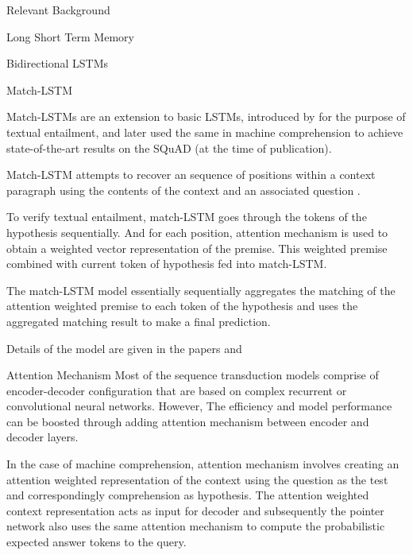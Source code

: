 \documentclass{article}
\begin{document}
\begin{psection}{Relevant Background}
\begin{psubsection}{Long Short Term Memory}
\begin{pssubsection}{Bidirectional LSTMs}

		\end{pssubsection}

		\begin{pssubsection}{Match-LSTM}

			Match-LSTMs \citep{match-lstm} are an extension to basic LSTMs, introduced by  for the purpose of textual entailment, and later used the same in machine comprehension to achieve state-of-the-art results on the SQuAD (at the time of publication).

			Match-LSTM attempts to recover an sequence of positions within a context paragraph using the contents of the context and an associated question \citep{match-lstm-m}.

			To verify textual entailment, match-LSTM goes through the tokens of the hypothesis sequentially. And for each position, attention mechanism is used to obtain a weighted vector representation of the premise. This weighted premise combined with current token of hypothesis fed into match-LSTM.

			\sloppy
			The match-LSTM model essentially sequentially aggregates the matching of the attention weighted premise to each token of the hypothesis and uses the aggregated matching result to make a final prediction.

			Details of the model are given in the papers \cite{match-lstm} and \cite{match-lstm-mc}

		\end{pssubsection}

		\begin{psubsection}{Attention Mechanism}
		Most of the sequence transduction models comprise of encoder-decoder configuration that are based on complex recurrent or convolutional neural networks. However, The efficiency and model performance can be boosted through adding attention mechanism between encoder and decoder layers.


		In the case of machine comprehension, attention mechanism involves creating an attention weighted representation of the context using the question as the test and correspondingly comprehension as hypothesis. The attention weighted context representation acts as input for decoder and subsequently the pointer network also uses the same attention mechanism to compute the probabilistic expected answer tokens to the query.
		\end{psubsection}

	\end{psubsection}

\end{psection}
\end{document}
